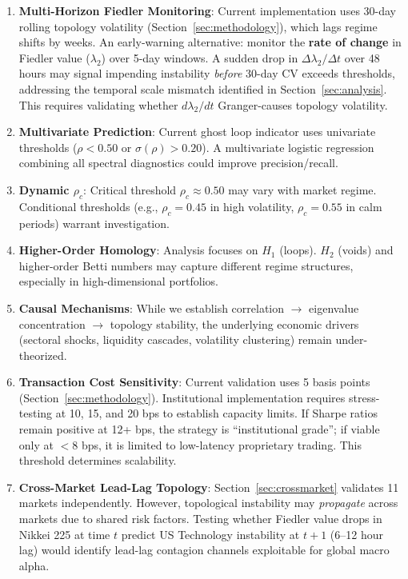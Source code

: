 \begin{enumerate}
\item \textbf{Multi-Horizon Fiedler Monitoring}: Current implementation uses 30-day rolling topology volatility (Section~\ref{sec:methodology}), which lags regime shifts by weeks. An early-warning alternative: monitor the \textbf{rate of change} in Fiedler value ($\lambda_2$) over 5-day windows. A sudden drop in $\Delta\lambda_2 / \Delta t$ over 48 hours may signal impending instability \textit{before} 30-day CV exceeds thresholds, addressing the temporal scale mismatch identified in Section~\ref{sec:analysis}. This requires validating whether $d\lambda_2/dt$ Granger-causes topology volatility.

\item \textbf{Multivariate Prediction}: Current ghost loop indicator uses univariate thresholds ($\rho < 0.50$ or $\sigma(\rho) > 0.20$). A multivariate logistic regression combining all spectral diagnostics could improve precision/recall.

\item \textbf{Dynamic $\rho_c$}: Critical threshold $\rho_c \approx 0.50$ may vary with market regime. Conditional thresholds (e.g., $\rho_c = 0.45$ in high volatility, $\rho_c = 0.55$ in calm periods) warrant investigation.

\item \textbf{Higher-Order Homology}: Analysis focuses on $H_1$ (loops). $H_2$ (voids) and higher-order Betti numbers may capture different regime structures, especially in high-dimensional portfolios.

\item \textbf{Causal Mechanisms}: While we establish correlation $\rightarrow$ eigenvalue concentration $\rightarrow$ topology stability, the underlying economic drivers (sectoral shocks, liquidity cascades, volatility clustering) remain under-theorized.

\item \textbf{Transaction Cost Sensitivity}: Current validation uses 5 basis points (Section~\ref{sec:methodology}). Institutional implementation requires stress-testing at 10, 15, and 20 bps to establish capacity limits. If Sharpe ratios remain positive at 12+ bps, the strategy is ``institutional grade''; if viable only at $<$8 bps, it is limited to low-latency proprietary trading. This threshold determines scalability.

\item \textbf{Cross-Market Lead-Lag Topology}: Section~\ref{sec:crossmarket} validates 11 markets independently. However, topological instability may \textit{propagate} across markets due to shared risk factors. Testing whether Fiedler value drops in Nikkei 225 at time $t$ predict US Technology instability at $t+1$ (6--12 hour lag) would identify lead-lag contagion channels exploitable for global macro alpha.
\end{enumerate}

